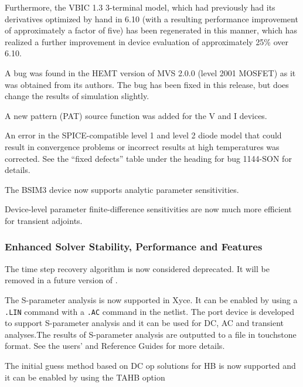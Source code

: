 \documentclass[letterpaper]{scrartcl}
\begin{document}
\begin{XyceItemize}
  Furthermore, the VBIC 1.3 3-terminal model, which had previously had
  its derivatives optimized by hand in \Xyce{} 6.10 (with a resulting
  performance improvement of approximately a factor of five) has been
  regenerated in this manner, which has realized a further improvement
  in device evaluation of approximately 25\% over \Xyce{} 6.10.
\item A bug was found in the HEMT version of MVS 2.0.0 (level 2001
  MOSFET) as it was obtained from its authors.  The bug has been fixed
  in this release, but does change the results of simulation slightly.
\item A new pattern (PAT) source function was added for the V
  and I devices.
\item An error in the SPICE-compatible level 1 and level 2 diode model
  that could result in convergence problems or incorrect results at
  high temperatures was corrected.  See the ``fixed defects'' table
  under the heading for bug 1144-SON for details.
\item The BSIM3 device now supports analytic parameter sensitivities.
\item Device-level parameter finite-difference sensitivities are now much more efficient for transient adjoints.
\end{XyceItemize}

\subsubsection*{Enhanced Solver Stability, Performance and Features}
\begin{XyceItemize}
\item The time step recovery algorithm is now considered deprecated.  It will be removed in a future version of \Xyce{}.

\item The S-parameter analysis is now supported in Xyce. It can be enabled by using a \verb|.LIN| command with a \verb|.AC| command in the netlist. The port device is developed to support S-parameter analysis and it can be used for DC, AC and transient analyses.The results of S-parameter analysis are outputted to a file in touchstone format. See the \Xyce{} users' and Reference Guides
for more details.

\item The initial guess method based on DC op solutions for HB is now supported and it can be enabled by using the TAHB option

\end{XyceItemize}
\end{document}
